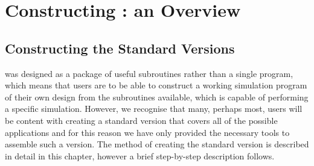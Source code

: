 \section{Constructing \D: an Overview}

\subsection{Constructing the Standard Versions}

\D was designed as a package of useful subroutines rather than a
single program, which means that users are to be able to construct
a working simulation program of their own design from the
subroutines available, which is capable of performing a specific
simulation.  However, we recognise that many, perhaps most, users
will be content with creating a standard version that covers all
of the possible applications and for this reason we have only
provided the necessary tools to assemble such a version.  The
method of creating the standard version is described in detail in
this chapter, however a brief step-by-step description follows.

